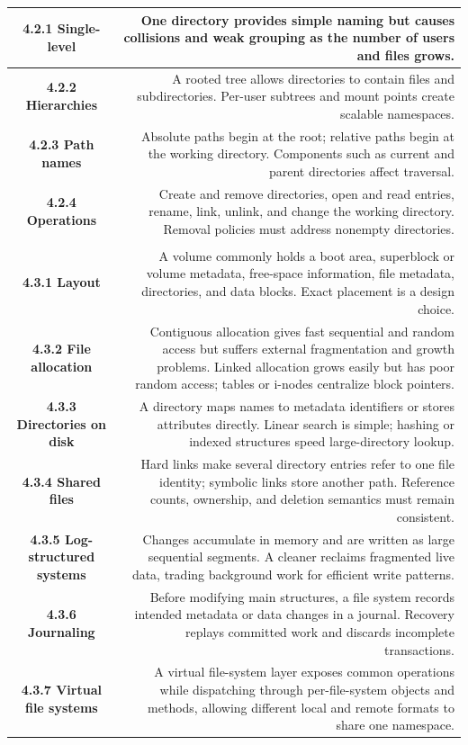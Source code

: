 \documentclass[10pt,letterpaper]{article}
\begin{document}
\begin{longtable}{C N}
\textbf{4.2.1 Single-level} & One directory provides simple naming but causes collisions and weak grouping as the number of users and files grows.\\\hline
\textbf{4.2.2 Hierarchies} & A rooted tree allows directories to contain files and subdirectories. Per-user subtrees and mount points create scalable namespaces.\\\hline
\textbf{4.2.3 Path names} & Absolute paths begin at the root; relative paths begin at the working directory. Components such as current and parent directories affect traversal.\\\hline
\textbf{4.2.4 Operations} & Create and remove directories, open and read entries, rename, link, unlink, and change the working directory. Removal policies must address nonempty directories.\\\hline
{}\\*\hline
\textbf{4.3.1 Layout} & A volume commonly holds a boot area, superblock or volume metadata, free-space information, file metadata, directories, and data blocks. Exact placement is a design choice.\\\hline
\textbf{4.3.2 File allocation} & Contiguous allocation gives fast sequential and random access but suffers external fragmentation and growth problems. Linked allocation grows easily but has poor random access; tables or i-nodes centralize block pointers.\\\hline
\textbf{4.3.3 Directories on disk} & A directory maps names to metadata identifiers or stores attributes directly. Linear search is simple; hashing or indexed structures speed large-directory lookup.\\\hline
\textbf{4.3.4 Shared files} & Hard links make several directory entries refer to one file identity; symbolic links store another path. Reference counts, ownership, and deletion semantics must remain consistent.\\\hline
\textbf{4.3.5 Log-structured systems} & Changes accumulate in memory and are written as large sequential segments. A cleaner reclaims fragmented live data, trading background work for efficient write patterns.\\\hline
\textbf{4.3.6 Journaling} & Before modifying main structures, a file system records intended metadata or data changes in a journal. Recovery replays committed work and discards incomplete transactions.\\\hline
\textbf{4.3.7 Virtual file systems} & A virtual file-system layer exposes common operations while dispatching through per-file-system objects and methods, allowing different local and remote formats to share one namespace.\\\hline

\end{longtable}
\end{document}

